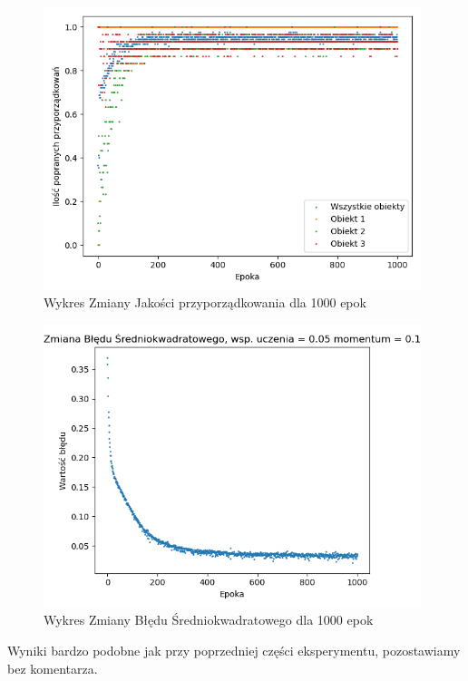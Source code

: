 \documentclass[12pt]{article}
\begin{document}
\begin{figure}[!ht]
 \centering
 \includegraphics[width=11cm]{WykresPrzyporzadkowania10neuron2wejscia2.png}
 \caption{Wykres Zmiany Jakości przyporządkowania dla 1000 epok}
 \vspace{-0.1cm}
 \label{WykresPrzyp12}
\end{figure}

\newpage

\begin{figure}[!ht]
 \centering
 \includegraphics[width=11cm]{WykresBlad10neuron2wejscia2.png}
 \caption{Wykres Zmiany Błędu Średniokwadratowego dla 1000 epok}
 \vspace{-0.1cm}
 \label{WykresBlad12}
\end{figure}

Wyniki bardzo podobne jak przy poprzedniej części eksperymentu, pozostawiamy bez komentarza.
\end{document}
